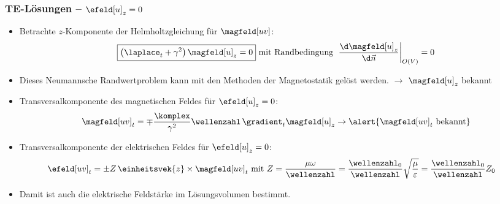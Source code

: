 \begin{frame}
  \frametitle{TE-Lösungen -- \(\efeld[u]_z = 0\)}
  \begin{itemize}[<+->]
  \item Betrachte \(z\)-Komponente der Helmholtzgleichung für \(\magfeld[uv]\):
    \begin{equation*}
      \boxed{\left(\laplace_t + \gamma^2\right) \magfeld[u]_z =  0} \text{ mit Randbedingung } \left. \frac{\d \magfeld[u]_z}{\d \vec{n}}\right|_{O(V)} = 0 
    \end{equation*}
  \item Dieses \alert{Neumannsche Randwertproblem} kann mit den Methoden der Magnetostatik gelöst werden. \(\to\) \alert{\(\magfeld[u]_z\) bekannt}
  \item Transversalkomponente des magnetischen Feldes für \(\efeld[u]_z = 0\):
    \begin{equation*}
      \magfeld[uv]_t = \mp \frac{\komplex}{\gamma^2} \wellenzahl\, \gradient_t \magfeld[u]_{z}  \to \alert{\magfeld[uv]_t \text{ bekannt}}
    \end{equation*}
  \item Transversalkomponente der elektrischen Feldes für \(\efeld[u]_z = 0\):
       \begin{align*}
         \efeld[uv]_t &= \pm Z\, \einheitsvek{z}\times \magfeld[uv]_{t} \text{ mit } Z=\frac{\mu\omega}{\wellenzahl} = \frac{\wellenzahl_0}{\wellenzahl}\sqrt{\frac{\mu}{\varepsilon}} = \frac{\wellenzahl_0}{\wellenzahl} Z_0 
       \end{align*}
       \item Damit ist auch die \alert{elektrische Feldstärke im Lösungsvolumen bestimmt}. 
       \end{itemize}
       \ 
\end{frame}


